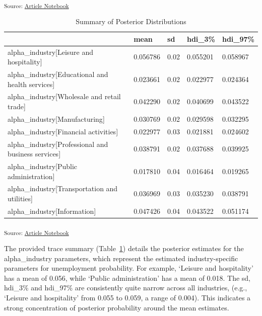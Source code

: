 \documentclass[
]{agujournal2019}
\begin{document}
\textsubscript{Source:
\href{https://mw1296.github.io/dsan5650_social_causal_inference/index.qmd.html}{Article
Notebook}}

\begin{longtable}[]{@{}lllll@{}}

\caption{\label{tbl-industry-trace-summary}Summary of Posterior
Distributions}

\tabularnewline

\toprule\noalign{}
& mean & sd & hdi\_3\% & hdi\_97\% \\
\midrule\noalign{}
\endhead
\bottomrule\noalign{}
\endlastfoot
alpha\_industry{[}Leisure and hospitality{]} & 0.056786 & 0.02 &
0.055201 & 0.058967 \\
alpha\_industry{[}Educational and health services{]} & 0.023661 & 0.02 &
0.022977 & 0.024364 \\
alpha\_industry{[}Wholesale and retail trade{]} & 0.042290 & 0.02 &
0.040699 & 0.043522 \\
alpha\_industry{[}Manufacturing{]} & 0.030769 & 0.02 & 0.029598 &
0.032295 \\
alpha\_industry{[}Financial activities{]} & 0.022977 & 0.03 & 0.021881 &
0.024602 \\
alpha\_industry{[}Professional and business services{]} & 0.038791 &
0.02 & 0.037688 & 0.039925 \\
alpha\_industry{[}Public administration{]} & 0.017810 & 0.04 & 0.016464
& 0.019265 \\
alpha\_industry{[}Transportation and utilities{]} & 0.036969 & 0.03 &
0.035230 & 0.038791 \\
alpha\_industry{[}Information{]} & 0.047426 & 0.04 & 0.043522 &
0.051174 \\

\end{longtable}

\textsubscript{Source:
\href{https://mw1296.github.io/dsan5650_social_causal_inference/index.qmd.html}{Article
Notebook}}

The provided trace summary (Table~\ref{tbl-industry-trace-summary})
details the posterior estimates for the alpha\_industry parameters,
which represent the estimated industry-specific parameters for
unemployment probability. For example, `Leisure and hospitality' has a
mean of 0.056, while `Public administration' has a mean of 0.018. The
sd, hdi\_3\% and hdi\_97\% are consistently quite narrow across all
industries, (e.g., `Leisure and hospitality' from 0.055 to 0.059, a
range of 0.004). This indicates a strong concentration of posterior
probability around the mean estimates.
\end{document}

